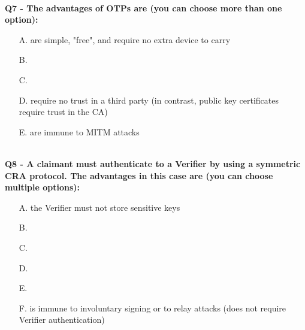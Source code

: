 \textbf{\\Q7 - The advantages of OTPs are (you can choose more than one option):}
\begin{enumerate}
	\item[A.] are simple, "free", and require no extra device to carry
	\item[B.] 
	\item[C.] 
	\item[D.] require no trust in a third party (in contrast, public key certificates require trust in the CA)
	\item[E.] are immune to MITM attacks
\end{enumerate}

\textbf{\\Q8 - A claimant must authenticate to a Verifier by using a symmetric CRA protocol. The advantages in this case are (you can choose multiple options):}
\begin{enumerate}
	\item[A.] the Verifier must not store sensitive keys
	\item[B.] 
	\item[C.] 
	\item[D.] 
	\item[E.] 
	\item[F.] is immune to involuntary signing or to relay attacks (does not require Verifier authentication)
\end{enumerate}

